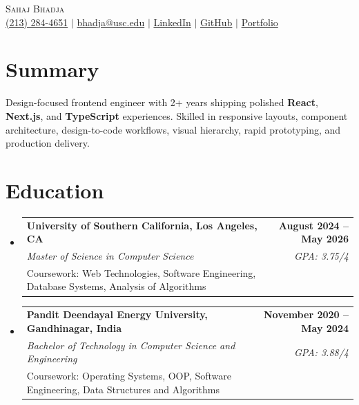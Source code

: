 \documentclass[letterpaper,10pt]{article}
\makeatletter
\newcommand{\resumeEduSubheading}[5]{\vspace{-1pt}\item\begin{tabular*}{1.0\textwidth}[t]{l@{\extracolsep{\fill}}r}\textbf{#1} & \textbf{\small #2} \\\textit{\small #3} & \textit{\small #4} \\\small #5 & \\\end{tabular*}\vspace{-4pt}}
\newcommand{\resumeSubHeadingListStart}{\begin{itemize}[leftmargin=0.0in,label={}]}
\newcommand{\resumeSubHeadingListEnd}{\end{itemize}}
\makeatother
\begin{document}
\begin{center}
  {\Huge \scshape Sahaj Bhadja} \\ \vspace{1pt}
  \small \href{tel:2132844651}{(213) 284-4651} $|$ \href{mailto:bhadja@usc.edu}{bhadja@usc.edu} $|$
  \href{https://www.linkedin.com/in/sahaj-bhadja/}{LinkedIn} $|$ \href{https://github.com/sahaj-bhadja}{GitHub} $|$ \href{https://sahaj-bhadja.github.io/}{Portfolio}
\end{center}
\vspace{-13pt}

\section{Summary}
\small Design-focused frontend engineer with 2+ years shipping polished \textbf{React}, \textbf{Next.js}, and \textbf{TypeScript} experiences. Skilled in responsive layouts, component architecture, design-to-code workflows, visual hierarchy, rapid prototyping, and production delivery.

\section{Education}
\resumeSubHeadingListStart
  \resumeEduSubheading{University of Southern California, Los Angeles, CA}{August 2024 -- May 2026}{Master of Science in Computer Science}{GPA: 3.75/4}{Coursework: Web Technologies, Software Engineering, Database Systems, Analysis of Algorithms}
  \vspace{2pt}
  \resumeEduSubheading{Pandit Deendayal Energy University, Gandhinagar, India}{November 2020 -- May 2024}{Bachelor of Technology in Computer Science and Engineering}{GPA: 3.88/4}{Coursework: Operating Systems, OOP, Software Engineering, Data Structures and Algorithms}
\resumeSubHeadingListEnd
\end{document}
